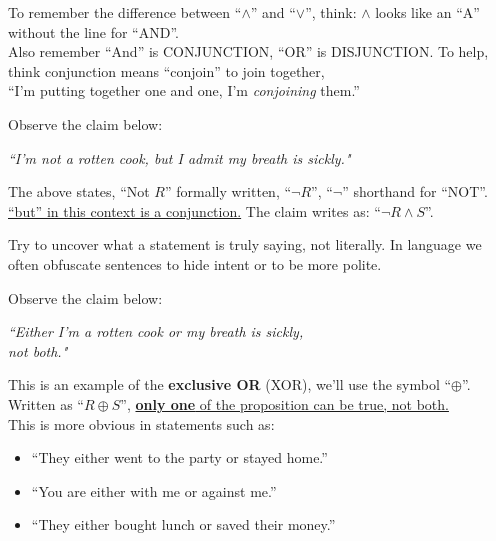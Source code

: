 \begin{Tip}
    To remember the difference between ``$\land$'' and ``$\lor$'', think: $\land$ looks like an ``A''
    without the line for ``AND''.\\

    \noindent
    Also remember ``And'' is CONJUNCTION, ``OR'' is DISJUNCTION. To
    help, think conjunction means ``conjoin'' to join together,\\ ``I'm putting together
    one and one, I'm \textit{conjoining} them.''\\
\end{Tip}

\noindent
Observe the claim below:
\vspace{1em}
\begin{center}
    \Large
    \textit{``I'm not a rotten cook, but I admit my breath is sickly."}
\end{center}
\vspace{1em}

\noindent
The above states, ``Not $R$'' formally written, ``$\neg R$'', ``$\neg$'' shorthand for ``NOT''.
\underline{``but'' in this context is a conjunction.} The claim writes as: ``$\neg R \land S$''.\\

\begin{Tip}
    Try to uncover what a statement is truly saying, not literally.
    In language we often obfuscate sentences to hide intent or to be more polite.\\
\end{Tip}

\noindent
Observe the claim below:
\vspace{1em}
\begin{center}
    \Large
    \textit{``Either I'm a rotten cook or my breath is sickly,\\ not both."}
\end{center}
\vspace{1em}

\noindent
This is an example of the \textbf{exclusive OR} (XOR), we'll use the symbol ``$\oplus$''.\\
Written as ``$R \oplus S$'', \underline{\textbf{only one} of the proposition can be true, not both.}\\

\noindent
This is more obvious in statements such as:
\begin{itemize}
    \item ``They either went to the party or stayed home.''
    \item ``You are either with me or against me.''
    \item ``They either bought lunch or saved their money.''
\end{itemize}

